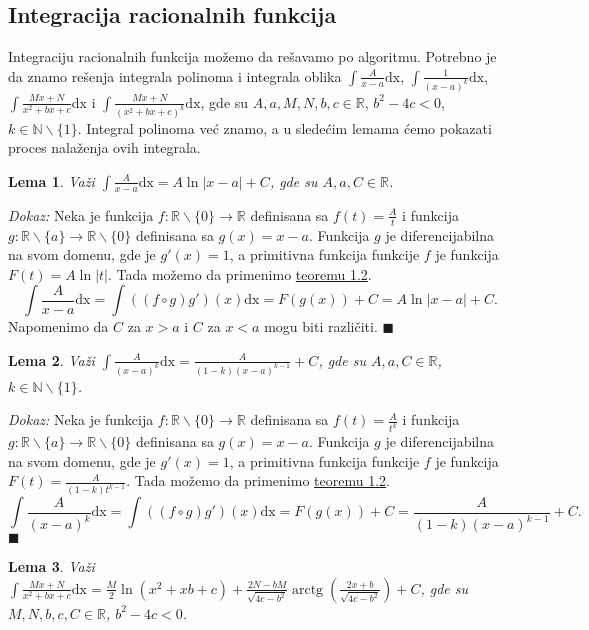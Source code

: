 \documentclass{article}
\newtheorem{lema}{Lema}[section]
\DeclareMathOperator{\arctg}{arctg}
\begin{document}
\subsection{Integracija racionalnih funkcija}
Integraciju racionalnih funkcija možemo da rešavamo po algoritmu.
Potrebno je da znamo rešenja integrala polinoma i integrala
oblika
$\displaystyle\int \frac{A}{x-a}\text{dx}$, $\displaystyle\int\frac{1}{(x-a)^k}\text{dx}$,
$\displaystyle\int \frac{Mx+N}{x^2+bx + c}\text{dx}$ i $\displaystyle\int \frac{Mx + N}{(x^2 + bx + c)^k}\text{dx}$,
gde su $A,a,M,N,b,c\in\mathbb{R}$, $b^2-4c<0$, $k\in\mathbb{N}\backslash\{1\}$.
Integral polinoma već znamo, a u sledećim lemama ćemo
pokazati proces nalaženja ovih integrala.
\begin{lemabox}
    \label{lema_1.1.1}
    \begin{lema}
        Važi $\displaystyle\int \frac{A}{x-a}\text{dx}=A\ln|x-a| + C$, gde su $A,a,C\in \mathbb{R}$.
    \end{lema}
\end{lemabox}
\textit{Dokaz:} Neka je funkcija $f:\mathbb{R}\backslash\{0\}\longrightarrow\mathbb{R}$ definisana sa
$f(t)=\frac{A}{t}$ i funkcija $g:\mathbb{R}\backslash\{a\}\longrightarrow\mathbb{R}\backslash\{0\}$
definisana sa $g(x)=x-a$. Funkcija $g$ je diferencijabilna na svom domenu, gde je $g'(x)=1$, a primitivna funkcija
funkcije $f$ je funkcija $F(t)=A\ln|t|$. Tada možemo da primenimo \hyperref[teorema_1.2]{teoremu 1.2}.
$$ \int \frac{A}{x-a}\text{dx} = \int ((f\circ g) g')(x)\text{dx} = F(g(x)) + C=A\ln|x-a| + C.$$
Napomenimo da $C$ za $x > a$ i $C$ za $x < a$ mogu biti različiti.
\null\hfill $\blacksquare$\par

\begin{lemabox}
    \begin{lema}
        \label{lema_1.1.2}
        Važi $\displaystyle\int \frac{A}{(x-a)^k}\text{dx}=\frac{A}{(1-k)(x-a)^{k-1}}+ C$, gde su $A,a,C\in \mathbb{R}$, $k\in\mathbb{N}\backslash\{1\}$.
    \end{lema}
\end{lemabox}

\textit{Dokaz:} Neka je funkcija $f:\mathbb{R}\backslash\{0\}\longrightarrow\mathbb{R}$ definisana sa
$f(t)=\frac{A}{t^k}$ i funkcija $g:\mathbb{R}\backslash\{a\}\longrightarrow\mathbb{R}\backslash\{0\}$
definisana sa $g(x)=x-a$. Funkcija $g$ je diferencijabilna na svom domenu, gde je $g'(x)=1$, a primitivna funkcija
funkcije $f$ je funkcija $F(t)=\frac{A}{(1-k)t^{k-1}}$. Tada možemo da primenimo \hyperref[teorema_1.2]{teoremu 1.2}.
$$\int \frac{A}{(x-a)^k}\text{dx} = \int ((f\circ g) g')(x)\text{dx} = F(g(x)) + C= \frac{A}{(1-k)(x-a)^{k-1}}+ C.$$
\null\hfill$\blacksquare$\par
\begin{lemabox}
    \label{lema_1.1.3}
    \begin{lema}
        Važi $\displaystyle\int \frac{Mx+N}{x^2+bx+c}\text{dx}= \frac{M}{2}\ln(x^2+xb+c)+\frac{2N-bM}{\sqrt{4c-b^2}}\arctg({\frac{2x+b}{\sqrt{4c-b^2}}})+ C$, gde su $M,N,b,c,C\in\mathbb{R}$, $b^2 - 4c < 0$.
    \end{lema}
\end{lemabox}
\end{document}
